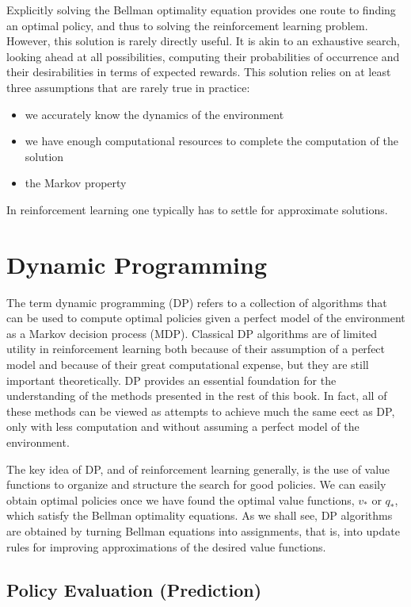 \documentclass{article}
\begin{document}
Explicitly solving the Bellman optimality equation provides one route to finding an optimal policy, and thus to solving the reinforcement learning problem. 
However, this solution is rarely directly useful. It is akin to an exhaustive search, looking ahead at all possibilities, computing their probabilities of occurrence and their desirabilities in terms of expected rewards. 
This solution relies on at least three assumptions that are rarely true in practice: 

\begin{itemize}
    \item we accurately know the dynamics of the environment
    \item we have enough computational resources to complete the computation of the solution
    \item the Markov property
\end{itemize}

In reinforcement learning one typically has to settle for approximate solutions.

\section{Dynamic Programming}

The term dynamic programming (DP) refers to a collection of algorithms that can be used to compute optimal policies given a perfect model of the environment as a Markov decision process (MDP). 
Classical DP algorithms are of limited utility in reinforcement learning both because of their assumption of a perfect model and because of their great computational expense, but they are still important theoretically. 
DP provides an essential foundation for the understanding of the methods presented in the rest of this book. In fact, all of these methods can be viewed as attempts to achieve much the same eect as DP, 
only with less computation and without assuming a perfect model of the environment.

The key idea of DP, and of reinforcement learning generally, is the use of value functions to organize and structure the search for good policies. 
We can easily obtain optimal policies once we have found the optimal value functions, \(v_*\) or \(q_*\), which satisfy the Bellman optimality equations. 
As we shall see, DP algorithms are obtained by turning Bellman equations into assignments, that is, into update rules for improving approximations of the desired value functions.

\subsection{Policy Evaluation (Prediction)}
\end{document}
